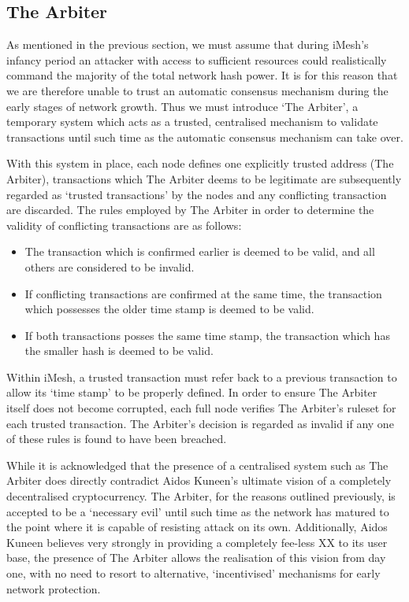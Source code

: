 \documentclass[a4paper,10pt,twocolumn]{article}
\begin{document}
\subsection{The Arbiter}

As mentioned in the previous section, we must assume that during iMesh's infancy period an attacker with access to sufficient resources 
could realistically command the majority of the total network hash power. It is for this reason that we are therefore unable to trust an 
automatic consensus mechanism during the early stages of network growth. Thus we must introduce `The Arbiter', a temporary system which 
acts as a trusted, centralised mechanism to validate transactions until such time as the automatic consensus mechanism can take over.

With this system in place, each node defines one explicitly trusted address (The Arbiter), transactions which The Arbiter deems to be 
legitimate are subsequently regarded as `trusted transactions' by the nodes and any conflicting transaction are discarded. The rules 
employed by The Arbiter in order to determine the validity of conflicting transactions are as follows:

\begin{itemize}
	\item The transaction which is confirmed earlier is deemed to be valid, and all others are considered to be invalid.
	\item If conflicting transactions are confirmed at the same time, the transaction which possesses the older time stamp is deemed 
	to be valid.
	\item If both transactions posses the same time stamp, the transaction which has the smaller hash
	is deemed to be valid.
\end{itemize}

Within iMesh, a trusted transaction must refer back to a previous transaction to allow its `time stamp' to be properly defined.
In order to ensure The Arbiter itself does not become corrupted, each full node verifies The Arbiter's ruleset for each trusted 
transaction. The Arbiter's decision is regarded as invalid if any one of these rules is found to have been breached.

While it is acknowledged that the presence of a centralised system such as The Arbiter does directly contradict Aidos Kuneen's ultimate 
vision of a completely decentralised cryptocurrency. The Arbiter, for the reasons outlined previously, is accepted to be a
`necessary evil' until such time as the network has matured to the point where it is capable of resisting attack on its own. 
Additionally, Aidos Kuneen believes very strongly in providing a completely fee-less XX to its user base, the presence of The Arbiter 
allows the realisation of this vision from day one, with no need to resort to alternative, `incentivised' mechanisms for early network 
protection.
\end{document}
